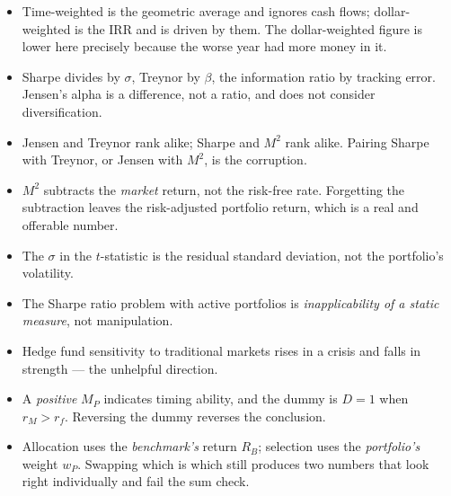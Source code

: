 \begin{imtrapbox}[title={Consolidated trap summary --- IM-7}]
\begin{itemize}
\item {} Time-weighted is the geometric average and ignores
cash flows; dollar-weighted is the IRR and is driven by them. The dollar-weighted
figure is lower here precisely because the worse year had more money in it.
\item {} Sharpe divides by $\sigma$, Treynor by $\beta$,
the information ratio by tracking error. Jensen's alpha is a difference, not a
ratio, and does not consider diversification.
\item {} Jensen and Treynor rank alike; Sharpe and $M^2$ rank
alike. Pairing Sharpe with Treynor, or Jensen with $M^2$, is the corruption.
\item {} $M^2$ subtracts the \emph{market} return, not the
risk-free rate. Forgetting the subtraction leaves the risk-adjusted portfolio
return, which is a real and offerable number.
\item {} The $\sigma$ in the $t$-statistic is the residual
standard deviation, not the portfolio's volatility.
\item {} The Sharpe ratio problem with active portfolios is
\emph{inapplicability of a static measure}, not manipulation.
\item {} Hedge fund sensitivity to traditional markets rises
in a crisis and falls in strength --- the unhelpful direction.
\item {} A \emph{positive} $M_P$ indicates timing ability, and
the dummy is $D = 1$ when $r_M > r_f$. Reversing the dummy reverses the
conclusion.
\item {} Allocation uses the \emph{benchmark's}
return $R_B$; selection uses the \emph{portfolio's} weight $w_P$. Swapping which
is which still produces two numbers that look right individually and fail the
sum check.
\end{itemize}
\end{imtrapbox}

